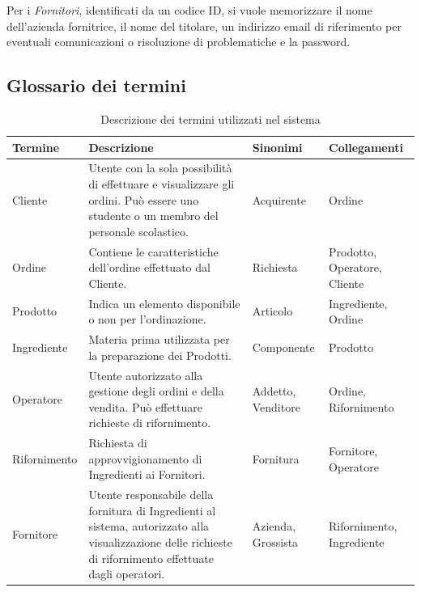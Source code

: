 \documentclass[12pt,a4paper]{article}
\begin{document}
    \vspace{8pt}
    \noindent
    Per i \textit{Fornitori}, identificati da un codice ID, si vuole memorizzare il nome dell'azienda fornitrice, il nome del titolare, un indirizzo email di riferimento per eventuali comunicazioni o risoluzione di problematiche e la password.

    \subsection{Glossario dei termini}
    \begin{table}[h]
        \renewcommand{\arraystretch}{1.3} %
        \centering
        \begin{tabular}{|m{3cm}|m{6cm}|m{3cm}|m{3cm}|}
            \hline
            \textbf{Termine} & \textbf{Descrizione} & \textbf{Sinonimi} & \textbf{Collegamenti} \\
            \hline
            Cliente & Utente con la sola possibilità di effettuare e visualizzare gli ordini. Può essere uno studente o un membro del personale scolastico. & Acquirente & Ordine \\
            \hline
            Ordine & Contiene le caratteristiche dell'ordine effettuato dal Cliente. & Richiesta & Prodotto, Operatore, Cliente \\
            \hline
            Prodotto & Indica un elemento disponibile o non per l'ordinazione. & Articolo & Ingrediente, Ordine \\
            \hline
            Ingrediente & Materia prima utilizzata per la preparazione dei Prodotti. & Componente & Prodotto \\
            \hline
            Operatore & Utente autorizzato alla gestione degli ordini e della vendita. Può effettuare richieste di rifornimento. & Addetto, Venditore & Ordine, Rifornimento \\
            \hline
            Rifornimento & Richiesta di approvvigionamento di Ingredienti ai Fornitori. & Fornitura & Fornitore, Operatore \\
            \hline
            Fornitore & Utente responsabile della fornitura di Ingredienti al sistema, autorizzato alla visualizzazione delle richieste di rifornimento effettuate dagli operatori. & Azienda, Grossista & Rifornimento, Ingrediente \\
            \hline
        \end{tabular}
        \caption{Descrizione dei termini utilizzati nel sistema}
        \label{tab:termini}
        \vspace{-20pt}
    \end{table}
\end{document}
